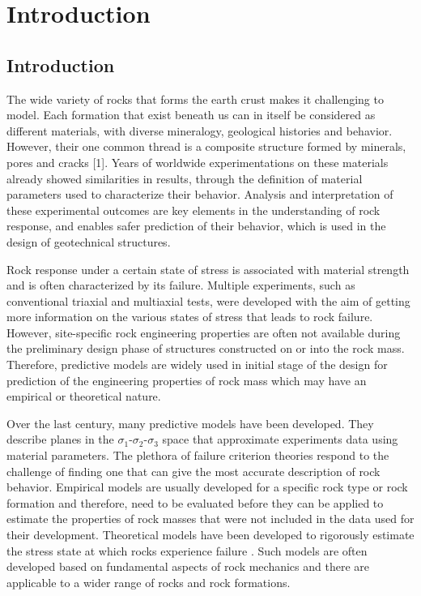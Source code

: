 \chapter{Introduction}
\section{Introduction}

The wide variety of rocks that forms the earth crust makes it challenging to model. Each formation that exist beneath us can in itself be considered as different materials, with diverse mineralogy, geological histories and behavior. However, their one common thread is a composite structure formed by minerals, pores and cracks [1]. Years of worldwide experimentations on these materials already showed similarities in results, through the definition of material parameters used to characterize their behavior. Analysis and interpretation of these experimental outcomes are key elements in the understanding of rock response, and enables safer prediction of their behavior, which is used in the design of geotechnical structures. 

Rock response under a certain state of stress is associated with material strength and is often characterized by its failure. Multiple experiments, such as conventional triaxial and multiaxial tests, were developed with the aim of getting more information on the various states of stress that leads to rock failure. However, site-specific rock engineering properties are often not available during the preliminary design phase of structures constructed on or into the rock mass. Therefore, predictive models are widely used in initial stage of the design for prediction of the engineering properties of rock mass which may have an empirical or theoretical nature. 

Over the last century, many predictive models have been developed. They describe planes in the $\sigma_1$-$\sigma_2$-$\sigma_3$ space that approximate experiments data using material parameters. The plethora of failure criterion theories respond to the challenge of finding one that can give the most accurate description of rock behavior. Empirical models are usually developed for a specific rock type or rock formation and therefore, need to be evaluated before they can be applied to estimate the properties of rock masses that were not included in the data used for their development. Theoretical models have been developed to rigorously estimate the stress state at which rocks experience failure \cite{Labuz2018}. Such models are often developed based on fundamental aspects of rock mechanics and there are applicable to a wider range of rocks and rock formations.

